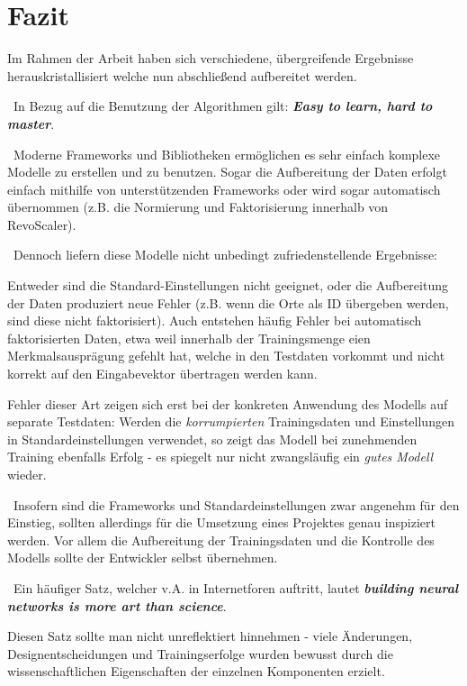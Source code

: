 \chapter{Fazit}
\label{cha:Fazit} \label{cha:Schluss}
Im Rahmen der Arbeit haben sich verschiedene, übergreifende Ergebnisse herauskristallisiert welche nun abschließend aufbereitet werden.

~\newline In Bezug auf die Benutzung der Algorithmen gilt: \textit{\textbf{Easy to learn, hard to master}}. 

~\newline Moderne Frameworks und Bibliotheken ermöglichen es sehr einfach komplexe Modelle zu erstellen und zu benutzen. Sogar die Aufbereitung der Daten erfolgt einfach mithilfe von unterstützenden Frameworks oder wird sogar automatisch übernommen (z.B. die Normierung und Faktorisierung innerhalb von RevoScaler).

~\newline Dennoch liefern diese Modelle nicht unbedingt zufriedenstellende Ergebnisse: 

Entweder sind die Standard-Einstellungen nicht geeignet, oder die Aufbereitung der Daten produziert neue Fehler (z.B. wenn die Orte als ID übergeben werden, sind diese nicht faktorisiert). Auch entstehen häufig Fehler bei automatisch faktorisierten Daten, etwa weil innerhalb der Trainingsmenge eien Merkmalsausprägung gefehlt hat, welche in den Testdaten vorkommt und nicht korrekt auf den Eingabevektor übertragen werden kann. 

Fehler dieser Art zeigen sich erst bei der konkreten Anwendung des Modells auf separate Testdaten: Werden die \textit{korrumpierten} Trainingsdaten und Einstellungen in Standardeinstellungen verwendet, so zeigt das Modell bei zunehmenden Training ebenfalls Erfolg - es spiegelt nur nicht zwangsläufig ein \textit{gutes Modell} wieder.

~\newline Insofern sind die Frameworks und Standardeinstellungen zwar angenehm für den Einstieg, sollten allerdings für die Umsetzung eines Projektes genau inspiziert werden. Vor allem die Aufbereitung der Trainingsdaten und die Kontrolle des Modells sollte der Entwickler selbst übernehmen.  

~\newline Ein häufiger Satz, welcher v.A. in Internetforen auftritt, lautet \textit{\textbf{building neural networks is more art than science}}.

Diesen Satz sollte man nicht unreflektiert hinnehmen - viele Änderungen, Designentscheidungen und Trainingserfolge wurden bewusst durch die wissenschaftlichen Eigenschaften der einzelnen Komponenten erzielt. 

